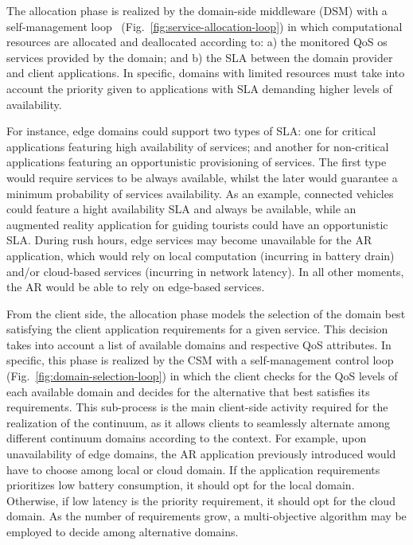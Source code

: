 The allocation phase is realized by the domain-side middleware (DSM) with a self-management loop~\cite{kephart2003vision} (Fig.~\ref{fig:service-allocation-loop}) in which computational resources are allocated and deallocated according to: a) the monitored QoS os services provided by the domain; and b) the SLA between the domain provider and client applications. In specific, domains with limited resources must take into account the priority given to applications with SLA demanding higher levels of availability. 

For instance, edge domains could support two types of SLA: one for critical applications featuring high availability of services; and another for non-critical applications featuring an opportunistic provisioning of services. The first type would require services to be always available, whilst the later would guarantee a minimum probability of services availability. As an example, connected vehicles could feature a hight availability SLA and always be available, while an augmented reality application for guiding tourists could have an opportunistic SLA. During rush hours, edge services may become unavailable for the AR application, which would rely on local computation (incurring in battery drain) and/or cloud-based services (incurring in network latency). In all other moments, the AR would be able to rely on edge-based services. 


From the client side, the allocation phase models the selection of the domain best satisfying the client application requirements for a given service. This decision takes into account a list of available domains and respective QoS attributes. In specific, this phase is realized by the CSM with a self-management control loop (Fig.~\ref{fig:domain-selection-loop}) in which the client checks for the QoS levels of each available domain and decides for the alternative that best satisfies its requirements. This sub-process is the main client-side activity required for the realization of the continuum, as it allows clients to seamlessly alternate among different continuum domains according to the context. For example, upon unavailability of edge domains, the AR application previously introduced would have to choose among local or cloud domain. If the application requirements prioritizes low battery consumption, it should opt for the local domain. Otherwise, if low latency is the priority requirement, it should opt for the cloud domain. As the number of requirements grow, a multi-objective algorithm may be employed to decide among alternative domains.



